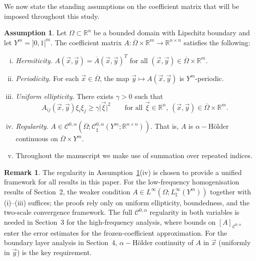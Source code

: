 \documentclass[a4paper,reqno]{amsart}
\numberwithin{equation}{section}
\numberwithin{equation}{section}		%
\numberwithin{figure}{section}			%
\numberwithin{table}{section}				%
\newcommand{\R}{\mathbb{R}}
\theoremstyle{definition}
\newtheorem{assumption}[theorem]{Assumption}
\newtheorem{remark}[theorem]{Remark}
\renewcommand{\bar}[1]{\overline{#1}}
\newcommand{\<}{\ensuremath \leq}
\renewcommand{\>}{\ensuremath \geq}
\begin{document}
We now state the standing assumptions on the coefficient matrix that will be imposed throughout this study.
\begin{assumption}\label{ass:A}
Let $\Omega\subset\R^n$ be a bounded domain with Lipschitz boundary and let $Y^m = {]0,1[}^m$. The coefficient matrix $A\colon \bar{\Omega}\times\R^m\to\R^{n\times n}$ satisfies the following:
\begin{enumerate}[(i)]
    \item \emph{Hermiticity.} $A(\vec{x},\vec{y}) = \overline{A}(\vec{x},\vec{y})^T$ for all $(\vec{x},\vec{y})\in\bar{\Omega}\times\R^m$.
    \item \emph{Periodicity.} For each $\vec{x}\in\bar{\Omega}$, the map $\vec{y}\mapsto A(\vec{x},\vec{y})$ is $Y^m$-periodic.
    \item \emph{Uniform ellipticity.} There exists $\gamma>0$ such that
    \begin{equation*}
        A_{ij}(\vec{x},\vec{y})\xi_i\xi_j \geq \gamma\lvert\vec{\xi}\rvert^2 \qquad \text{for all } \vec{\xi}\in\R^n,\ (\vec{x},\vec{y})\in\bar{\Omega}\times\R^m.
    \end{equation*}
    \item \emph{Regularity.} $A\in \mathcal{C}^{0,\alpha}(\bar{\Omega}; \mathcal{C}^{0,\alpha}_\sharp(Y^m;\R^{n\times n}))$. That is, $A$ is $\alpha-$Hölder continuous on $\overline{\Omega}\times Y^m$.
    \item Throughout the manuscript we make use of summation over repeated indices.
\end{enumerate}
\end{assumption}

\begin{remark}
    The regularity in Assumption~\ref{ass:A}(iv) is chosen to provide a unified framework for all results in this paper. For the low-frequency homogenisation results of Section~2, the weaker condition $A\in L^\infty(\Omega; L^\infty_\sharp(Y^m))$ together with (i)--(iii) suffices; the proofs rely only on uniform ellipticity, boundedness, and the two-scale convergence framework. The full $\mathcal{C}^{0,\alpha}$ regularity in both variables is needed in Section~3 for the high-frequency analysis, where bounds on $[A]_{\mathcal{C}^{0,\alpha}}$ enter the error estimates for the frozen-coefficient approximation. For the boundary layer analysis in Section~4, $\alpha-$Hölder continuity of $A$ in $\vec{x}$ (uniformly in $\vec{y}$) is the key requirement.
\end{remark}
\end{document}

